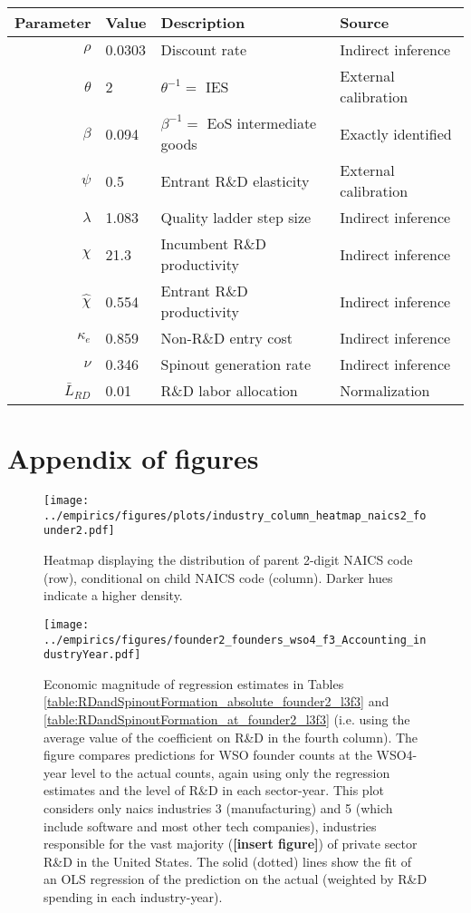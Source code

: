 \documentclass[11pt,english]{article}
\begin{document}
\begin{table}[]
	\centering
	\label{calibration_2_parameters}
	\begin{tabular}{rlll}
		\toprule \toprule
		Parameter & Value & Description & Source \tabularnewline
		\midrule
		$\rho$ & 0.0303 & Discount rate  & Indirect inference \tabularnewline
		$\theta$ & 2 & $\theta^{-1} = $ IES & External calibration 
		\tabularnewline
		$\beta$ & 0.094 & $\beta^{-1} = $ EoS intermediate goods & Exactly identified \tabularnewline 
		$\psi$ & 0.5 & Entrant R\&D elasticity & External calibration \tabularnewline
		$\lambda$ & 1.083 & Quality ladder step size & Indirect inference 
		\tabularnewline
		$\chi$ & 21.3 & Incumbent R\&D productivity & Indirect inference 
		\tabularnewline
		$\hat{\chi}$ & 0.554 & Entrant R\&D productivity & Indirect inference \tabularnewline 
		$\kappa_e$ & 0.859 & Non-R\&D entry cost & Indirect inference \tabularnewline
		$\nu$ & 0.346 & Spinout generation rate  & Indirect inference\tabularnewline
		$\bar{L}_{RD}$ & 0.01 & R\&D labor allocation  & Normalization \tabularnewline
		\bottomrule
	\end{tabular}
\end{table}



\newpage
\section{Appendix of figures}

\setcounter{figure}{0}
\renewcommand{\thefigure}{\Alph{section}\arabic{figure}}

\begin{figure}[!htb]
	\centering
	\texttt{[image: ../empirics/figures/plots/industry\_column\_heatmap\_naics2\_founder2.pdf]}
	\caption{Heatmap displaying the distribution of parent 2-digit NAICS code (row), conditional on child NAICS code (column). Darker hues indicate a higher density.}
	\label{figure:industry_column_heatmap_naics2_founder2}
\end{figure}

\begin{figure}[]
	\centering
	\texttt{[image: ../empirics/figures/founder2\_founders\_wso4\_f3\_Accounting\_industryYear.pdf]}
	\caption{Economic magnitude of regression estimates in Tables \ref{table:RDandSpinoutFormation_absolute_founder2_l3f3} and \ref{table:RDandSpinoutFormation_at_founder2_l3f3} (i.e. using the average value of the coefficient on R\&D in the fourth column). The figure compares predictions for WSO founder counts at the WSO4-year level to the actual counts, again using only the regression estimates and the level of R\&D in each sector-year. This plot considers only naics industries 3 (manufacturing) and 5 (which include software and most other tech companies), industries responsible for the vast majority (\textbf{[insert figure]}) of private sector R\&D in the United States. The solid (dotted) lines show the fit of an OLS regression of the prediction on the actual (weighted by R\&D spending in each industry-year).}
	\label{figure:founder2_founders_f3_Accounting_industryYear}
\end{figure}
\end{document}
